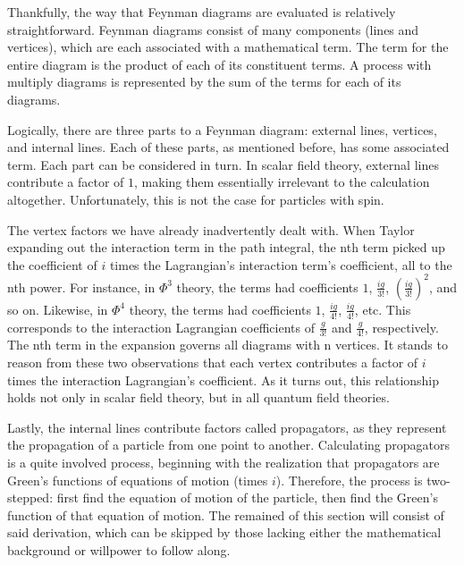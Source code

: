 \documentclass{report}
\begin{document}
Thankfully, the way that Feynman diagrams are evaluated is relatively straightforward. Feynman diagrams consist of many components (lines and vertices), which are each associated with a mathematical term. The term for the entire diagram is the product of each of its constituent terms. A process with multiply diagrams is represented by the sum of the terms for each of its diagrams.

Logically, there are three parts to a Feynman diagram: external lines, vertices, and internal lines. Each of these parts, as mentioned before, has some associated term. Each part can be considered in turn. In scalar field theory, external lines contribute a factor of $1$, making them essentially irrelevant to the calculation altogether. Unfortunately, this is not the case for particles with spin.

The vertex factors we have already inadvertently dealt with. When Taylor expanding out the interaction term in the path integral, the nth term picked up the coefficient of $i$ times the Lagrangian's interaction term's coefficient, all to the nth power. For instance, in $\Phi^3$ theory, the terms had coefficients $1$, $\frac{ig}{3!}$, $(\frac{ig}{3!})^2$, and so on. Likewise, in $\Phi^4$ theory, the terms had coefficients $1$, $\frac{ig}{4!}$, $\frac{ig}{4!}$, etc. This corresponds to the interaction Lagrangian coefficients of $\frac{g}{3!}$ and $\frac{g}{4!}$, respectively. The nth term in the expansion governs all diagrams with n vertices. It stands to reason from these two observations that each vertex contributes a factor of $i$ times the interaction Lagrangian's coefficient. As it turns out, this relationship holds not only in scalar field theory, but in all quantum field theories.

Lastly, the internal lines contribute factors called propagators, as they represent the propagation of a particle from one point to another. Calculating propagators is a quite involved process, beginning with the realization that propagators are Green's functions of equations of motion (times $i$). Therefore, the process is two-stepped: first find the equation of motion of the particle, then find the Green's function of that equation of motion. The remained of this section will consist of said derivation, which can be skipped by those lacking either the mathematical background or willpower to follow along.
\end{document}

